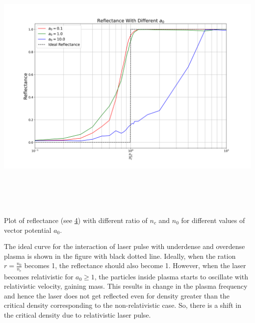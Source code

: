 \documentclass[12pt]{article}
\newenvironment{changemargin}[2]{%
\begin{list}{}{%
\setlength{\topsep}{0pt}%
\setlength{\leftmargin}{#1}%
\setlength{\rightmargin}{#2}%
\setlength{\listparindent}{\parindent}%
\setlength{\itemindent}{\parindent}%
\setlength{\parsep}{\parskip}%
}%
\item[]}{\end{list}}
\begin{document}
\begin{changemargin}{-3cm}{-3cm}
    \includegraphics[width=20cm, height=13cm]{reflection.png}
    \begin{center}
        Plot of reflectance (see \hyperref[reflectance]{4}) with different ratio of $n_c$ and $n_0$ for different values of vector potential $a_0$.
    \end{center}
    \vspace*{0.2cm}
    The ideal curve for the interaction of laser pulse with underdense and overdense plasma is shown in the figure with black dotted line. Ideally, when the ration $r = \frac{n_0}{n_c}$ becomes 1, the reflectance should also become 1. However, when the laser becomes relativistic for $a_0 \ge 1$, the particles inside plasma starts to oscillate with relativistic velocity, gaining mass. This results in change in the plasma frequency and hence the laser does not get reflected even for density greater than the critical density corresponding to the non-relativistic case. So, there is a shift in the critical density due to relativistic laser pulse.


\end{changemargin}
\end{document}
